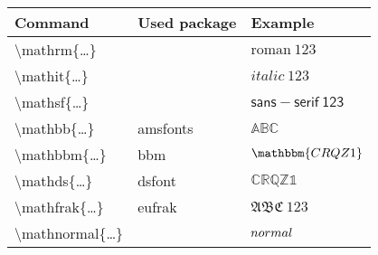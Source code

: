 \documentclass{article}
\renewcommand*\c{\textbackslash\ttfamily}
\begin{document}
\thispagestyle{empty}
\sffamily
\begin{tabular}{lll}
\toprule
\textbf{Command} & \textbf{Used package} & \textbf{Example} \\
\midrule
\c mathrm\{\ldots\}     &          & \(\mathrm{roman\ 123}\) \\
\c mathit\{\ldots\}     &          & \(\mathit{italic\ 123}\) \\
\c mathsf\{\ldots\}     &          & \(\mathsf{sans-serif\ 123}\) \\
\c mathbb\{\ldots\}     & amsfonts & \(\mathbb{ABC}\)  \\
\c mathbbm\{\ldots\}    & bbm      & \(\mathbbm{C R Q Z 1}\)  \\
\c mathds\{\ldots\}     & dsfont   &\(\mathds{C R Q Z 1}\)  \\
\c mathfrak\{\ldots\}   & eufrak   & \(\mathfrak{A B C \ 1 2 3}\)  \\
\c mathnormal\{\ldots\} &          & \(\mathnormal{normal}\)  \\
\bottomrule
\end{tabular}
\end{document}
